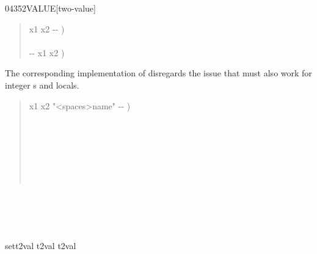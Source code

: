 \begin{worddef}{0435}{2VALUE}[two-value]
\begin{implement}
		\begin{quote}\ttfamily
			\word{:}   x1 x2 -{}- ) \\
			\tab {} \word{,} \word{,} \\
			\tab {}   -{}- x1 x2 ) \\
			\word{;}
		\end{quote}

		The corresponding implementation of  disregards the
		issue that  must also work for integer s
		and locals.

		\begin{quote}\ttfamily
			\word{:}   x1 x2 "<spaces>name" -{}- ) \\
			\tab {}  \\
			\tab {}   \\
			\tab[2]     \\
			\tab {} \\
			\tab[2]  \\
			\tab {} \\
			\word{;} 
		\end{quote}
	\end{implement}

	\begin{testing}\ttfamily %
		 \\
		 \\[2ex]
		 \\
		 \\[2ex]
		\word{:} sett2val t2val   t2val \word{;} \\
	\end{testing}
\end{worddef}

